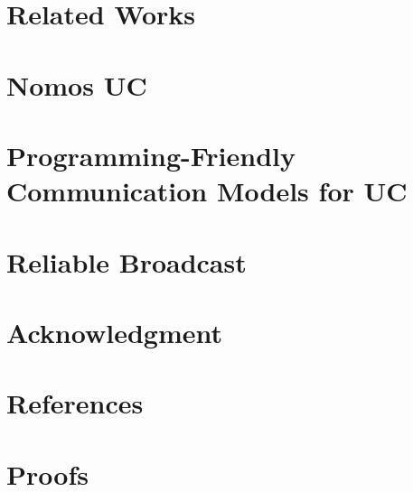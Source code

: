 \documentclass[conference]{IEEEtran}
\begin{document}
\section{Related Works}


%

\section{Nomos UC}


%

\section{Programming-Friendly Communication Models for UC} \label{sec:wrappers}


\section{Reliable Broadcast} \label{sec:rbc}


\section*{Acknowledgment}

\section*{References}


\appendix

\section{Proofs}


%

\pagebreak

\begin{figure}

\end{figure}
\end{document}
